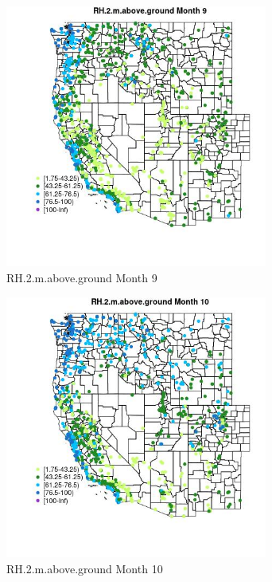 \begin{figure} 
\centering  
\includegraphics[width=0.77\textwidth]{Code_Outputs/Report_ML_input_PM25_Step4_part_f_de_duplicated_aveswNAs_MapObsMo9RH2maboveground.jpg} 
\caption{\label{fig:Report_ML_input_PM25_Step4_part_f_de_duplicated_aveswNAsMapObsMo9RH2maboveground}RH.2.m.above.ground Month 9} 
\end{figure} 
 

\begin{figure} 
\centering  
\includegraphics[width=0.77\textwidth]{Code_Outputs/Report_ML_input_PM25_Step4_part_f_de_duplicated_aveswNAs_MapObsMo10RH2maboveground.jpg} 
\caption{\label{fig:Report_ML_input_PM25_Step4_part_f_de_duplicated_aveswNAsMapObsMo10RH2maboveground}RH.2.m.above.ground Month 10} 
\end{figure} 
 

